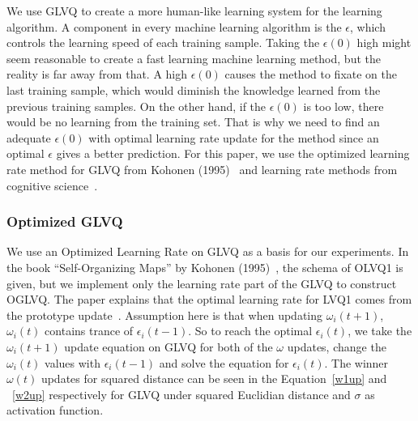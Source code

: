 We use GLVQ to create a more human-like learning system for the learning algorithm. A component in every machine learning algorithm is the $\epsilon$, which controls the learning speed of each training sample. Taking the $\epsilon(0)$ high might seem reasonable to create a fast learning machine learning method, but the reality is far away from that. A high $\epsilon(0)$ causes the method to fixate on the last training sample, which would diminish the knowledge learned from the previous training samples. On the other hand, if the $\epsilon(0)$ is too low, there would be no learning from the training set. That is why we need to find an adequate $\epsilon(0)$ with optimal learning rate update for the method since an optimal $\epsilon$ gives a better prediction. For this paper, we use the optimized learning rate method for GLVQ from Kohonen (1995)~\cite{kohonen1} and learning rate methods from cognitive science~\cite{els,cogn,lrimp}.


\subsubsection{Optimized GLVQ}

We use an Optimized Learning Rate on GLVQ as a basis for our experiments. In the book “Self-Organizing Maps” by Kohonen (1995)~\cite{kohonen1}, the schema of OLVQ1 is given, but we implement only the learning rate part of the GLVQ to construct OGLVQ. The paper explains that the optimal learning rate for LVQ1 comes from the prototype update~\cite{kohonen1}. Assumption here is that when updating $\omega_{i}(t+1)$, $\omega_{i}(t)$ contains trance of $\epsilon_{i}(t-1)$. So to reach the optimal $\epsilon_{i}(t)$, we take the $\omega_{i}(t+1)$ update equation on GLVQ for both of the $\omega$ updates, change the $\omega_{i}(t)$ values with $\epsilon_{i}(t-1)$ and solve the equation for $\epsilon_{i}(t)$. The winner $\omega(t)$ updates for squared distance can be seen in the Equation~\eqref{w1up} and ~\eqref{w2up} respectively for GLVQ under squared Euclidian distance and $\sigma$ as activation function.
\vspace{10pt}


